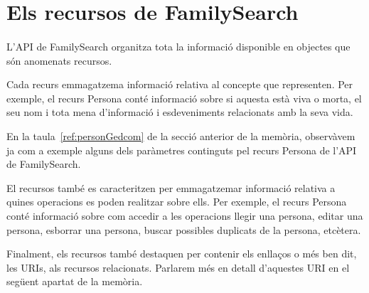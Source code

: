 \section{Els recursos de FamilySearch}

    \paragraph{}
    L'API de FamilySearch organitza tota la informació disponible en objectes que són anomenats recursos.

    Cada recurs emmagatzema informació relativa al concepte que representen. Per exemple, el recurs Persona conté informació sobre si aquesta està viva o morta, el seu nom i tota mena d'informació i esdeveniments relacionats amb la seva vida.

    En la taula~\ref{ref:personGedcom} de la secció anterior de la memòria, observàvem ja com a exemple alguns dels paràmetres continguts pel recurs Persona de l'API de FamilySearch.

    El recursos també es caracteritzen per emmagatzemar informació relativa a quines operacions es poden realitzar sobre ells. Per exemple, el recurs Persona conté informació sobre com accedir a les operacions llegir una persona, editar una persona, esborrar una persona, buscar possibles duplicats de la persona, etcètera.

    Finalment, els recursos també destaquen per contenir els enllaços o més ben dit, les URIs, als recursos relacionats. Parlarem més en detall d’aquestes URI en el següent apartat de la memòria.
